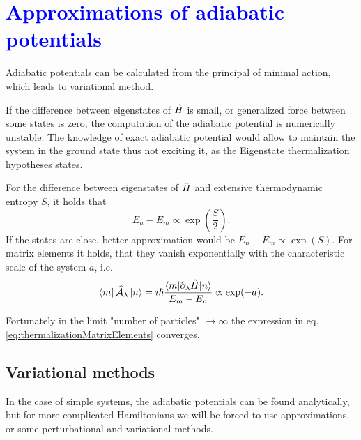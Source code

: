 \section{\textcolor{blue}{Approximations of adiabatic potentials}}
Adiabatic potentials can be calculated from the principal of minimal action, which leads to variational method.

If the difference between eigenstates of $\hat{H}$ is small, or generalized force between some states is zero, the computation of the adiabatic potential is numerically unstable. The knowledge of exact adiabatic potential would allow to maintain the system in the ground state thus not exciting it, as the Eigenstate thermalization hypotheses states.

\begin{hypot}
  For the difference between eigenstates of $\hat{H}$ and extensive thermodynamic entropy $S$, it holds that
    \begin{equation}
    E_n-E_m\propto \exp\left(\frac{S}{2}\right).
  \end{equation}
  If the states are close, better approximation would be $E_n-E_m\propto \exp(S)$. For matrix elements it holds, that they vanish exponentially with the characteristic scale of the system $a$, i.e.
  \begin{equation}
    \bra{m}\mathcal{\widehat{A}}_\lambda\ket{n} = i\hbar\frac{\braket{m|\partial_\lambda \hat{H}|n}}{E_m-E_n} \propto \exp(-a).
    \label{eq:thermalizationMatrixElements}
\end{equation}
\end{hypot}
Fortunately in the limit "number of particles" $\rightarrow \infty$ the expression in eq. \ref{eq:thermalizationMatrixElements} converges.



\subsection{Variational methods}
In the case of simple systems, the adiabatic potentials can be found analytically, but for more complicated Hamiltonians we will be forced to use approximations, or some perturbational and variational methods.
